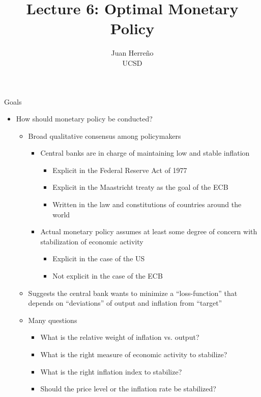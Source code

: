 \documentclass[11pt,aspectratio=169,xcolor={dvipsnames},hyperref={pdftex,pdfpagemode=UseNone,hidelinks,pdfdisplaydoctitle=true},usepdftitle=false]{beamer}
\title{Lecture 6: Optimal Monetary Policy}
\author{Juan Herre\~{n}o\\UCSD}
\begin{document}
\maketitle


\begin{frame}{Goals}
\begin{itemize}
\item How should monetary policy be conducted?
\begin{itemize}
\item Broad qualitative consensus among policymakers
\begin{itemize}
\item Central banks are in charge of maintaining low and stable inflation
\begin{itemize}
\item Explicit in the Federal Reserve Act of 1977
\item Explicit in the Maastricht treaty as the goal of the ECB
\item Written in the law and constitutions of countries around the world
\end{itemize}
\item Actual monetary policy assumes at least some degree of concern with stabilization of economic activity
\begin{itemize}
\item Explicit in the case of the US
\item Not explicit in the case of the ECB
\end{itemize}
\end{itemize}
\item Suggests the central bank wants to minimize a ``loss-function'' that depends on ``deviations'' of output and inflation from ``target''
\item Many questions
\begin{itemize}
\item What is the relative weight of inflation vs. output?
\item What is the right measure of economic activity to stabilize?
\item What is the right inflation index to stabilize?
\item Should the price level or the inflation rate be stabilized?
\end{itemize}
\end{itemize}
\end{itemize}
\end{frame}
\end{document}
